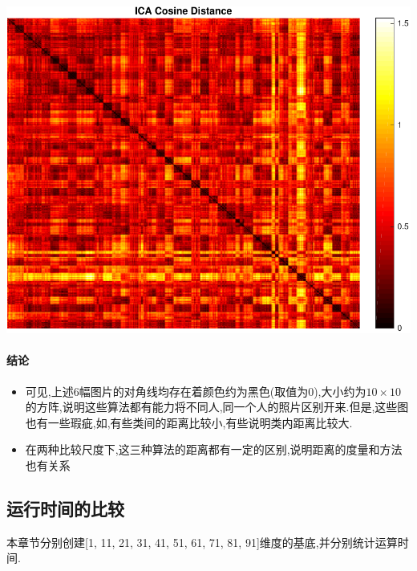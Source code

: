 \begin{center}
\begin{minipage}[t]{\linewidth}
\center
{
\includegraphics[width=\MyFactor\textwidth]{Img/icacos} 
}
\end{minipage}
\medskip
\end{center}


\paragraph{结论}
\begin{itemize}
	\item 可见,上述6幅图片的对角线均存在着颜色约为黑色(取值为0),大小约为$10 \times 10$的方阵,说明这些算法都有能力将不同人,同一个人的照片区别开来.但是,这些图也有一些瑕疵,如,有些类间的距离比较小,有些说明类内距离比较大.
	\item 在两种比较尺度下,这三种算法的距离都有一定的区别,说明距离的度量和方法也有关系
\end{itemize}

\subsection{运行时间的比较}
\label{sec:pni_cal_time}
本章节分别创建[1, 11, 21, 31, 41, 51, 61, 71, 81, 91]维度的基底,并分别统计运算时间.
